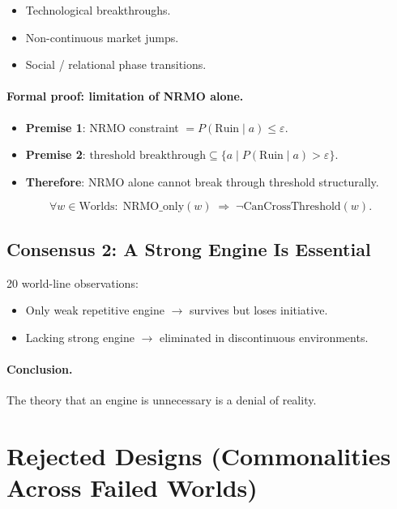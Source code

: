 \begin{itemize}
\item Technological breakthroughs.
\item Non-continuous market jumps.
\item Social / relational phase transitions.
\end{itemize}

\paragraph{Formal proof: limitation of NRMO alone.}

\begin{itemize}
\item \textbf{Premise 1}: NRMO constraint $= P(\mathrm{Ruin} \mid a)
\le \varepsilon$.
\item \textbf{Premise 2}: $\text{threshold breakthrough} \subseteq
\{a \mid P(\mathrm{Ruin} \mid a) > \varepsilon\}$.
\item \textbf{Therefore}: NRMO alone cannot break through threshold
structurally.
\end{itemize}

\begin{equation}
\forall w \in \mathrm{Worlds}:\;
\mathrm{NRMO\_only}(w) \;\Rightarrow\;
\neg \mathrm{CanCrossThreshold}(w).
\label{eq:nrmo-alone-limitation}
\end{equation}

\subsection{Consensus 2: A Strong Engine Is Essential}

20 world-line observations:

\begin{itemize}
\item Only weak repetitive engine $\to$ survives but loses
initiative.
\item Lacking strong engine $\to$ eliminated in discontinuous
environments.
\end{itemize}

\paragraph{Conclusion.}
The theory that an engine is unnecessary is a denial of reality.

\section{Rejected Designs (Commonalities Across Failed Worlds)}
\label{sec:strong-engine-failures}

